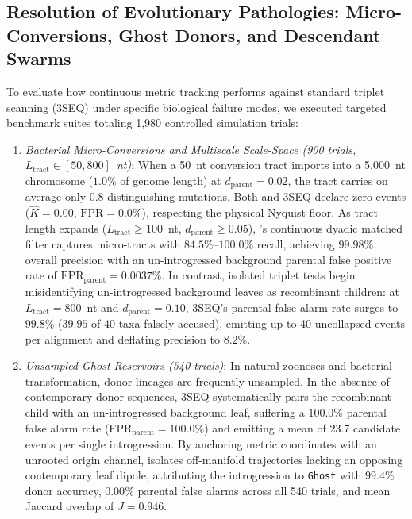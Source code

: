 \subsection{Resolution of Evolutionary Pathologies: Micro-Conversions, Ghost Donors, and Descendant Swarms}
\label{subsec:sim_pathologies}

To evaluate how continuous metric tracking performs against standard triplet scanning (3SEQ) under specific biological failure modes, we executed targeted benchmark suites totaling 1,980 controlled simulation trials:

\begin{enumerate}
    \item \textit{Bacterial Micro-Conversions and Multiscale Scale-Space (900 trials, $L_{\mathrm{tract}} \in [50, 800]$~nt)}:
    When a 50~nt conversion tract imports into a 5,000~nt chromosome ($1.0\%$ of genome length) at $d_{\mathrm{parent}} = 0.02$, the tract carries on average only 0.8 distinguishing mutations. Both \RhizAeon and 3SEQ declare zero events ($\hat{K} = 0.00$, $\text{FPR} = 0.0\%$), respecting the physical Nyquist floor. As tract length expands ($L_{\mathrm{tract}} \ge 100$~nt, $d_{\mathrm{parent}} \ge 0.05$), \RhizAeon's continuous dyadic matched filter captures micro-tracts with $84.5\%$--$100.0\%$ recall, achieving $99.98\%$ overall precision with an un-introgressed background parental false positive rate of $\text{FPR}_{\mathrm{parent}} = 0.0037\%$. In contrast, isolated triplet tests begin misidentifying un-introgressed background leaves as recombinant children: at $L_{\mathrm{tract}} = 800$~nt and $d_{\mathrm{parent}} = 0.10$, 3SEQ's parental false alarm rate surges to $99.8\%$ ($39.95$ of $40$ taxa falsely accused), emitting up to 40 uncollapsed events per alignment and deflating precision to $8.2\%$.
    
    \item \textit{Unsampled Ghost Reservoirs (540 trials)}:
    In natural zoonoses and bacterial transformation, donor lineages are frequently unsampled. In the absence of contemporary donor sequences, 3SEQ systematically pairs the recombinant child with an un-introgressed background leaf, suffering a $100.0\%$ parental false alarm rate ($\text{FPR}_{\mathrm{parent}} = 100.0\%$) and emitting a mean of 23.7 candidate events per single introgression. By anchoring metric coordinates with an unrooted origin channel, \RhizAeon isolates off-manifold trajectories lacking an opposing contemporary leaf dipole, attributing the introgression to \texttt{Ghost} with $99.4\%$ donor accuracy, $0.00\%$ parental false alarms across all 540 trials, and mean Jaccard overlap of $J = 0.946$.
    

\end{enumerate}
